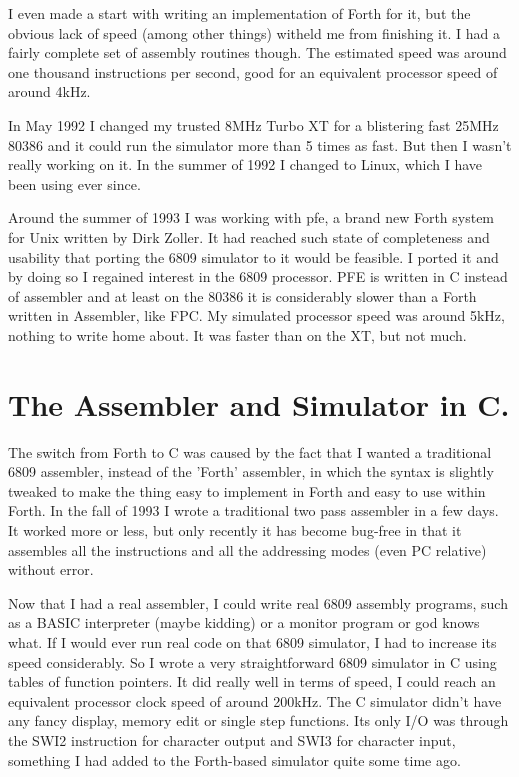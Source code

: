 I even made a start with writing an implementation of Forth for it, but the
obvious lack of speed (among other things) witheld me from finishing it.
I had a fairly complete set of assembly routines though.
The estimated speed was around one thousand instructions per second, good
for an equivalent processor speed of around 4kHz.

In May 1992 I changed my trusted 8MHz Turbo XT for a blistering fast 25MHz
80386 and it could run the simulator more than 5 times as fast. But then I
wasn't really working on it. In the summer of 1992 I changed to Linux, which
I have been using ever since.  

Around the summer of 1993 I was working with pfe, a brand new Forth system 
for Unix written by Dirk Zoller. It had reached such state of completeness
and usability that porting the 6809 simulator to it would be feasible.
I ported it and by doing so I regained interest in the 6809 processor. 
PFE is written in C instead of assembler and at least on the 80386 it is
considerably slower than a Forth written in Assembler, like FPC. My
simulated processor speed was around 5kHz, nothing to write home
about. It was faster than on the XT, but not much. 

\section{The Assembler and Simulator in C.}

The switch from Forth to C was caused by the fact that I wanted a
traditional 6809 assembler, instead of the 'Forth' assembler, in which the
syntax is slightly tweaked to make the thing easy to implement in Forth and
easy to use within Forth. In the fall of 1993 I wrote a traditional two pass
assembler in a few days. It worked more or less, but only recently it has
become bug-free in that it assembles all the instructions and all the
addressing modes (even PC relative) without error. 

Now that I had a real assembler, I could write real 6809 assembly programs,
such as a BASIC interpreter (maybe kidding) or a monitor program or god
knows what. If I would ever run real code on that 6809 simulator, I had to
increase its speed considerably. So I wrote a very straightforward 
6809 simulator in C using tables of function pointers. It did really well in
terms of speed, I could reach an equivalent processor clock speed of around
200kHz. The C simulator didn't have any fancy display, memory edit or single
step functions. Its only I/O was through the SWI2 instruction for character
output and SWI3 for character input, something I had added to the
Forth-based simulator quite some time ago.

